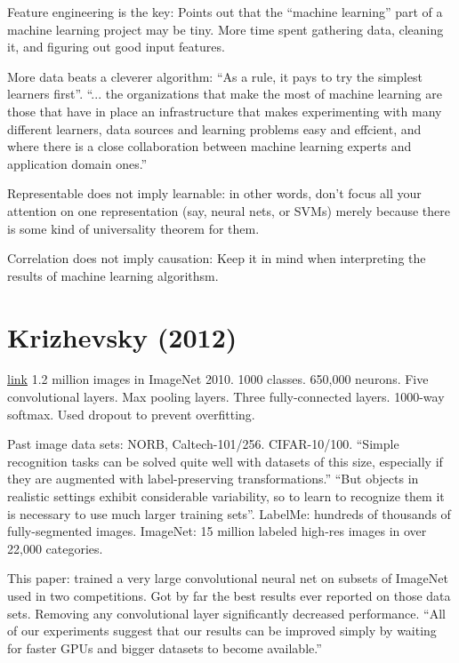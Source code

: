 \documentclass[12pt]{report}
\newcommand{\link}[2]{\href{#1}{#2}}
\begin{document}
Feature engineering is the key: Points out that the ``machine
learning'' part of a machine learning project may be tiny.  More time
spent gathering data, cleaning it, and figuring out good input
features.

More data beats a cleverer algorithm: ``As a rule, it pays to try the
simplest learners first''.  ``... the organizations that make the most
of machine learning are those that have in place an infrastructure
that makes experimenting with many different learners, data sources
and learning problems easy and effcient, and where there is a close
collaboration between machine learning experts and application domain
ones.''

Representable does not imply learnable: in other words, don't focus
all your attention on one representation (say, neural nets, or SVMs)
merely because there is some kind of universality theorem for them.

Correlation does not imply causation: Keep it in mind when
interpreting the results of machine learning algorithsm.

\section{Krizhevsky (2012)}

\link{http://www.cs.toronto.edu/~hinton/absps/imagenet.pdf}{link} 1.2
million images in ImageNet 2010.  1000 classes.  650,000 neurons.
Five convolutional layers.  Max pooling layers.  Three fully-connected
layers.  1000-way softmax.  Used dropout to prevent overfitting.

Past image data sets: NORB, Caltech-101/256. CIFAR-10/100.  ``Simple
recognition tasks can be solved quite well with datasets of this size,
especially if they are augmented with label-preserving
transformations.''  ``But objects in realistic settings exhibit
considerable variability, so to learn to recognize them it is
necessary to use much larger training sets''.  LabelMe: hundreds of
thousands of fully-segmented images.  ImageNet: 15 million labeled
high-res images in over 22,000 categories.

This paper: trained a very large convolutional neural net on subsets
of ImageNet used in two competitions.  Got by far the best results
ever reported on those data sets.  Removing any convolutional layer
significantly decreased performance.  ``All of our experiments suggest
that our results can be improved simply by waiting for faster GPUs and
bigger datasets to become available.''
\end{document}
